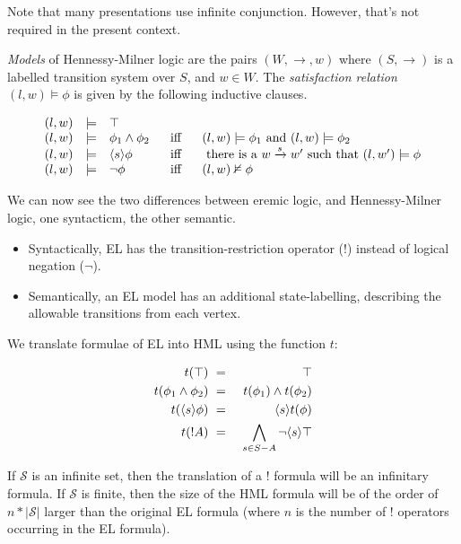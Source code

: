 \NI Note that many presentations use infinite conjunction. However,
that's not required in the present context.

 \emph{Models} of Hennessy-Milner logic are the pairs $(W,
\rightarrow, w)$ where $(S, \rightarrow)$ is a labelled transition
system over $S$, and $w \in W$.  The \emph{satisfaction relation} $(l,
w) \models \phi$ is given by the following inductive clauses.

\[
\begin{array}{lclcl}
  (l,w) & \models & \top  \\
  (l,w) & \models & \phi_1 \land \phi_2 &\  \mbox{ iff }\  & (l,w)  \models \phi_1 \mbox { and } (l,w) \models \phi_2  \\
  (l,w) & \models & \langle s \rangle \phi & \mbox{ iff } & \mbox{ there is a } w \xrightarrow{s} w' \mbox { such that } (l,w') \models \phi  \\
  (l,w) & \models & \neg \phi & \mbox{ iff } & (l,w)  \nvDash \phi 
\end{array}
\]

\NI We can now see the two differences between eremic logic, and
Hennessy-Milner logic, one syntacticm, the other semantic.

\begin{itemize}

\item Syntactically, EL has the transition-restriction operator ($!$)
  instead of logical negation ($\neg$).

\item Semantically, an EL model has an additional state-labelling,
  describing the allowable transitions from each vertex.

\end{itemize}

\NI We translate formulae of EL into HML using the function $t$:

\begin{eqnarray*}
  t(\top) & \ = \ & \top  \\
  t(\phi_1 \land \phi_2) & \ = \ & t(\phi_1) \land t(\phi_2)  \\
  t(\langle s \rangle \phi) & \ = \ & \langle s \rangle t(\phi)  \\
  t(! A) & \ = \ & \bigwedge_{s \in S - A} \neg \langle s \rangle \top 
\end{eqnarray*}

\NI If $\mathcal{S}$ is an infinite set, then the translation of a $!$
formula will be an infinitary formula.  If $\mathcal{S}$ is finite,
then the size of the HML formula will be of the order of $n *
|\mathcal{S}|$ larger than the original EL formula (where $n$ is the
number of $!$ operators occurring in the EL formula).


